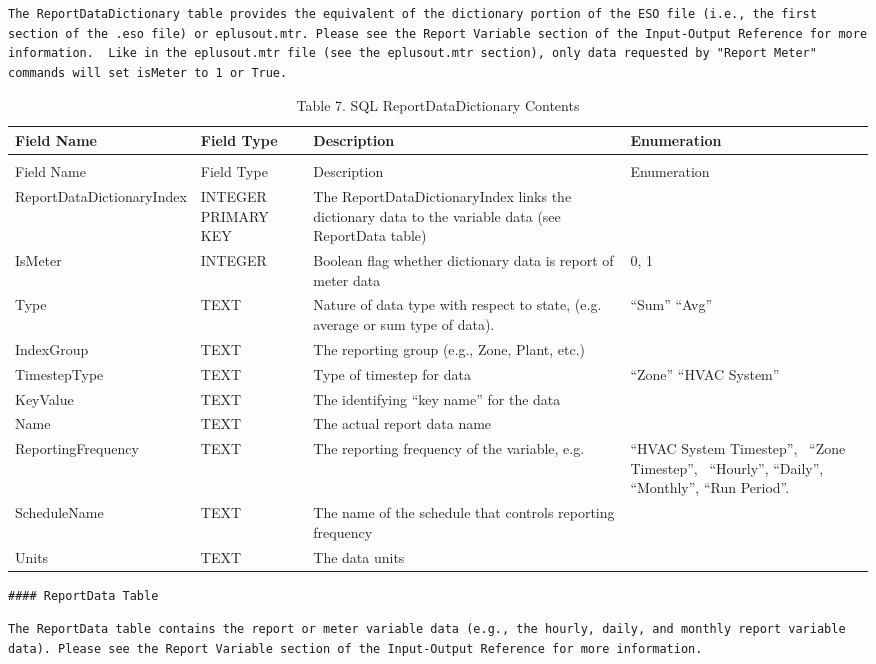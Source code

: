 \begin{lstlisting}
The ReportDataDictionary table provides the equivalent of the dictionary portion of the ESO file (i.e., the first section of the .eso file) or eplusout.mtr. Please see the Report Variable section of the Input-Output Reference for more information.  Like in the eplusout.mtr file (see the eplusout.mtr section), only data requested by "Report Meter" commands will set isMeter to 1 or True.
\end{lstlisting}

\begin{longtable}[c]{p{1.5in}p{1.5in}p{1.5in}p{1.5in}}
\caption{Table 7. SQL ReportDataDictionary Contents \label{table:table-7.-sql-reportdatadictionary-contents}} \tabularnewline
\toprule 
Field Name & Field Type & Description & Enumeration \tabularnewline
\midrule
\endfirsthead

\caption[]{Table 7. SQL ReportDataDictionary Contents} \tabularnewline
\toprule 
Field Name & Field Type & Description & Enumeration \tabularnewline
\midrule
\endhead

ReportDataDictionaryIndex & INTEGER PRIMARY KEY & The ReportDataDictionaryIndex links the dictionary data to the variable data (see ReportData table) & ~ \tabularnewline
IsMeter & INTEGER & Boolean flag whether dictionary data is report of meter data & 0, 1 \tabularnewline
Type & TEXT & Nature of data type with respect to state, (e.g. average or sum type of data). & “Sum” “Avg” \tabularnewline
IndexGroup & TEXT & The reporting group (e.g., Zone, Plant, etc.) & ~ \tabularnewline
TimestepType & TEXT & Type of timestep for data & “Zone”
    “HVAC System” \tabularnewline
KeyValue & TEXT & The identifying “key name” for the data & ~ \tabularnewline
Name & TEXT & The actual report data name & ~ \tabularnewline
ReportingFrequency & TEXT & The reporting frequency of the variable, e.g. & “HVAC System Timestep”,~ “Zone Timestep”,~ “Hourly”, “Daily”, “Monthly”, “Run Period”. \tabularnewline
ScheduleName & TEXT & The name of the schedule that controls reporting frequency & ~ \tabularnewline
Units & TEXT & The data units & ~ \tabularnewline
\bottomrule
\end{longtable}

\begin{lstlisting}
#### ReportData Table
\end{lstlisting}

\begin{lstlisting}
The ReportData table contains the report or meter variable data (e.g., the hourly, daily, and monthly report variable data). Please see the Report Variable section of the Input-Output Reference for more information.
\end{lstlisting}

